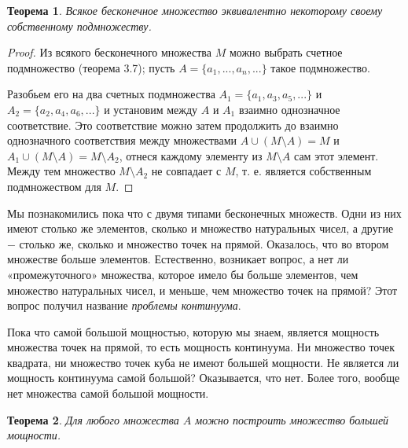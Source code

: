 \documentclass{article}
\newtheorem{theorem}{Теорема}[section]
\begin{document}
\begin{theorem}
Всякое бесконечное множество эквивалентно некоторому своему собственному подмножеству.
\end{theorem}

\begin{proof}
Из всякого бесконечного множества \(M\) можно выбрать счетное подмножество (теорема 3.7); пусть \(A = \{a_1, ..., a_n, ...\}\) такое подмножество.

Разобьем его на два счетных подмножества \(A_1 = \{a_1, a_3, a_5, ...\}\) и \(A_2 = \{a_2, a_4, a_6, ...\}\) и установим между \(A\) и \(A_1\) взаимно однозначное соответствие. Это соответствие можно затем продолжить до взаимно однозначного соответствия между множествами \(A \cup (M \setminus A) = M\) и \(A_1 \cup (M \setminus A) = M \setminus A_2\), отнеся каждому элементу из \(M \setminus A\) сам этот элемент. Между тем множество \(M \setminus A_2\) не совпадает с \(M\), т. е. является собственным подмножеством для \(M\).
\end{proof}

Мы познакомились пока что с двумя типами бесконечных множеств. Одни из них имеют столько же элементов, сколько и множество натуральных чисел, а другие \(-\) столько же, сколько и множество точек на прямой. Оказалось, что во втором множестве больше элементов. Естественно, возникает вопрос, а нет ли «промежуточного» множества, которое имело бы больше элементов, чем множество натуральных чисел, и меньше, чем множество точек на прямой? Этот вопрос получил название \textit{проблемы континуума}. \newline

Пока что самой большой мощностью, которую мы знаем, является мощность множества точек на прямой, то есть мощность континуума. Ни множество точек квадрата, ни множество точек куба не имеют большей мощности. Не является ли мощность континуума самой большой? Оказывается, что нет. Более того, вообще нет множества самой большой мощности.

\begin{theorem}
Для любого множества \(A\) можно построить множество большей мощности.
\end{theorem}
\end{document}
